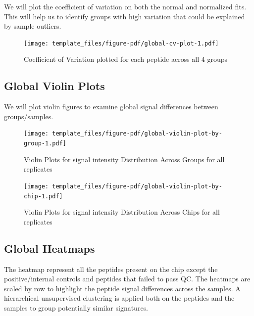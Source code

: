 \documentclass[
  letterpaper,
  DIV=11,
  numbers=noendperiod]{scrreport}
\begin{document}
We will plot the coefficient of variation on both the normal and
normalized fits. This will help us to identify groups with high
variation that could be explained by sample outliers.

\begin{figure}[htbp]

{\centering \texttt{[image: template\_files/figure-pdf/global-cv-plot-1.pdf]}

}

\caption{Coefficient of Variation plotted for each peptide across all 4
groups}

\end{figure}

\hypertarget{global-violin-plots}{%
\subsection{Global Violin Plots}\label{global-violin-plots}}

We will plot violin figures to examine global signal differences between
groups/samples.

\begin{figure}[htbp]

{\centering \texttt{[image: template\_files/figure-pdf/global-violin-plot-by-group-1.pdf]}

}

\caption{Violin Plots for signal intensity Distribution Across Groups
for all replicates}

\end{figure}

\begin{figure}[htbp]

{\centering \texttt{[image: template\_files/figure-pdf/global-violin-plot-by-chip-1.pdf]}

}

\caption{Violin Plots for signal intensity Distribution Across Chips for
all replicates}

\end{figure}

\hypertarget{global-heatmaps}{%
\subsection{Global Heatmaps}\label{global-heatmaps}}

The heatmap represent all the peptides present on the chip except the
positive/internal controls and peptides that failed to pass QC. The
heatmaps are scaled by row to highlight the peptide signal differences
across the samples. A hierarchical unsupervised clustering is applied
both on the peptides and the samples to group potentially similar
signatures.
\end{document}
